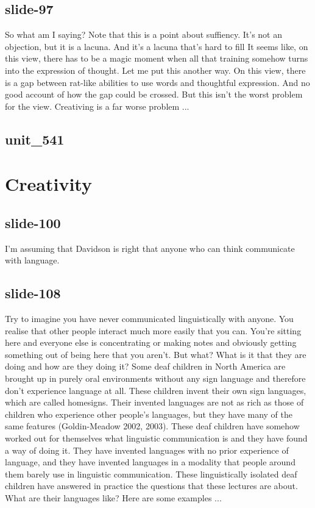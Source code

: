 \documentclass[12pt,\papersize]{extarticle}
\begin{document}
 
\subsection{slide-97}
So what am I saying?
Note that this is a point about suffiency. It's not an objection, but it is a lacuna.
And it's a lacuna that's hard to fill
It seems like, on this view, there has to be a magic moment when all that training somehow turns into the expression of thought.
Let me put this another way.
On this view, there is a gap between rat-like abilities to use words and thoughtful expression.
And no good account of how the gap could be crossed.
But this isn't the worst problem for the view. Creativing is a far worse problem ...
 
 
\subsection{unit\_541}
 
\section{Creativity}
 
 
\subsection{slide-100}
I'm assuming that Davidson is right that anyone who can think communicate with language.
 
 
\subsection{slide-108}
Try to imagine you have never communicated linguistically with anyone. You realise that other people interact much more easily that you can. You're sitting here and everyone else is concentrating or making notes and obviously getting something out of being here that you aren't. But what? What is it that they are doing and how are they doing it?
Some deaf children in North America are brought up in purely oral environments without any sign language and therefore don't experience language at all. These children invent their own sign languages, which are called homesigns. Their invented languages are not as rich as those of children who experience other people's languages, but they have many of the same features (Goldin-Meadow 2002, 2003). These deaf children have somehow worked out for themselves what linguistic communication is and they have found a way of doing it. They have invented languages with no prior experience of language, and they have invented languages in a modality that people around them barely use in linguistic communication. These linguistically isolated deaf children have answered in practice the questions that these lectures are about.
What are their languages like? Here are some examples ...
 
\end{document}
